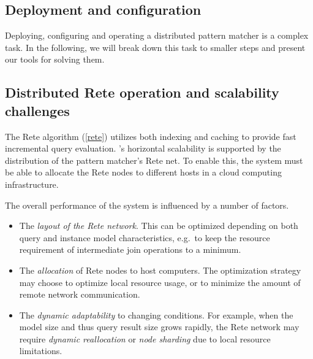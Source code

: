 
\subsection{Deployment and configuration}
\label{deployment-configuration}

Deploying, configuring and operating a distributed pattern matcher is a complex task. In the following, we will break down this task to smaller steps and present our tools for solving them.


\subsection{Distributed Rete operation and scalability challenges}

The Rete algorithm (\autoref{rete}) utilizes both indexing and caching to provide fast incremental query evaluation. \iqd{}'s horizontal scalability is supported by the distribution of the pattern matcher's Rete net. To enable this, the system must be able to allocate the Rete nodes to different hosts in a cloud computing infrastructure. 

The overall performance of the system is influenced by a number of factors.

\begin{itemize}
  \item The \emph{layout of the Rete network}. This can be optimized depending on both query and instance model characteristics, e.g.\ to keep the resource requirement of intermediate join operations to a minimum.
  \item The \emph{allocation} of Rete nodes to host computers. The optimization strategy may choose to optimize local resource usage, or to minimize the amount of remote network communication.
  \item The \emph{dynamic adaptability} to changing conditions. For example, when the model size and thus query result size grows rapidly, the Rete network may require \emph{dynamic reallocation} or \emph{node sharding} due to local resource limitations.
\end{itemize}


